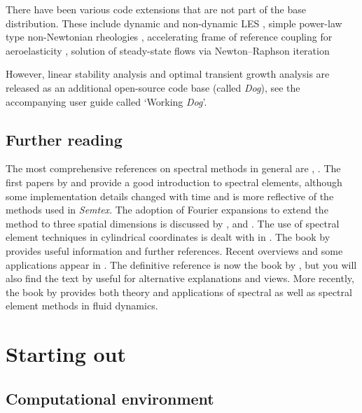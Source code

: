 \documentclass[11pt]{report}
\newcommand{\Semtex}{\emph{Semtex}} \newcommand{\Dog}{\emph{Dog}}
\begin{document}
There have been various code extensions that are not part of the base
distribution. These include dynamic and non-dynamic LES
\citep{blsc03}, simple power-law type non-Newtonian rheologies
\citep{rb06}, accelerating frame of reference coupling for
aeroelasticity \citep{bh96a,bh99,bgw01,hmb03}, solution of
steady-state flows via Newton--Raphson iteration \citep{hmb02a}

However, linear stability analysis
\citep{hmb02a,bllo03b,bllo03a,bml05,shbl05,ebs06,blsh07} and optimal
transient growth analysis \citep{bbs08a} are released as an additional
open-source code base (called \Dog), see the accompanying user guide
called `Working \Dog'.

\section{Further reading}

The most comprehensive references on spectral methods in general are
\citet{gs77}, \citet{chqz88,chqz06}.  The first papers by
\citet{pat84} and \citet{kp86} provide a good introduction to spectral
elements, although some implementation details changed with time and
\citet{mt89} is more reflective of the methods used in \Semtex.  The
adoption of Fourier expansions to extend the method to three spatial
dimensions is discussed by \citet{ap89}, \citet{kar89} and
\citet{kar90}.  The use of spectral element techniques in cylindrical
coordinates is dealt with in \citet{blsh04}.  The book by
\citet{fun97} provides useful information and further references.
Recent overviews and some applications appear in \citet{kh98,hen99b}.
The definitive reference is now the book by \citet{kars05}, but you
will also find the text by \citet*{dfm02} useful for alternative
explanations and views. More recently, the book by \citet{chqz07}
provides both theory and applications of spectral as well as spectral
element methods in fluid dynamics.

\chapter{Starting out}

\section{Computational environment}
\end{document}
